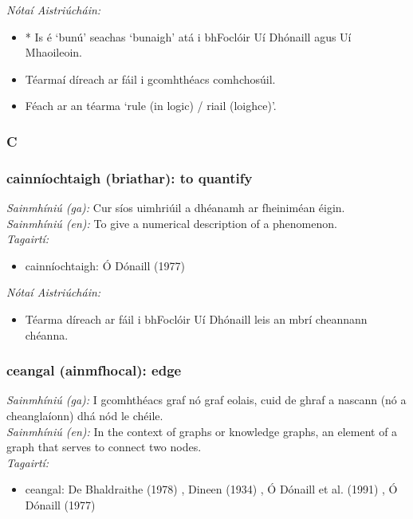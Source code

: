  \noindent \textit{Nótaí Aistriúcháin:}
\begin{itemize}
	\item * Is é `bunú' seachas `bunaigh' atá i bhFoclóir Uí Dhónaill agus Uí Mhaoileoin.
	\item Téarmaí díreach ar fáil i gcomhthéacs comhchosúil.
	\item Féach ar an téarma `rule (in logic) / riail (loighce)'.
\end{itemize}


 \subsubsection*{C}

\subsubsection*{cainníochtaigh (briathar): to quantify}
 \noindent \textit{Sainmhíniú (ga):} Cur síos uimhriúil a dhéanamh ar fheiniméan éigin.
\\
 \noindent \textit{Sainmhíniú (en):} To give a numerical description of a phenomenon.
\\
 \noindent \textit{Tagairtí:}
\begin{itemize}
	\item cainníochtaigh: Ó Dónaill (1977) \cite{odonaill}
\end{itemize}

 \noindent \textit{Nótaí Aistriúcháin:}
\begin{itemize}
	\item Téarma díreach ar fáil i bhFoclóir Uí Dhónaill leis an mbrí cheannann chéanna.
\end{itemize}


\subsubsection*{ceangal (ainmfhocal): edge}
 \noindent \textit{Sainmhíniú (ga):} I gcomhthéacs graf nó graf eolais, cuid de ghraf a nascann (nó a cheanglaíonn) dhá nód le chéile.
\\
 \noindent \textit{Sainmhíniú (en):} In the context of graphs or knowledge graphs, an element of a graph that serves to connect two nodes.
\\
 \noindent \textit{Tagairtí:}
\begin{itemize}
	\item ceangal: De Bhaldraithe (1978) \cite{de-bhaldraithe}, Dineen (1934) \cite{dineen}, Ó Dónaill et al. (1991) \cite{focloir-beag}, Ó Dónaill (1977) \cite{odonaill}
\end{itemize}

